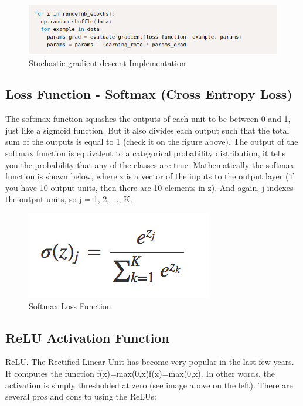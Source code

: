 \documentclass[12pt]{report}
\begin{document}
\begin{figure}[h]
    \centering
    \includegraphics[width=\textwidth]{sgd.png}
    \caption{Stochastic gradient descent Implementation}
\end{figure}

\subsection*{Loss Function - Softmax (Cross Entropy Loss)
}
The softmax function squashes the outputs of each unit to be between 0 and 1, just like a sigmoid function. But it also divides each output such that the total sum of the outputs is equal to 1 (check it on the figure above).
The output of the softmax function is equivalent to a categorical probability distribution, it tells you the probability that any of the classes are true.
Mathematically the softmax function is shown below, where z is a vector of the inputs to the output layer (if you have 10 output units, then there are 10 elements in z). And again, j indexes the output units, so j = 1, 2, ..., K.

\begin{figure}[h]
    \centering
    \includegraphics[scale=.5]{eqn2.png}
    \caption{Softmax Loss Function}
\end{figure}

\subsection*{ReLU Activation Function}

ReLU. The Rectified Linear Unit has become very popular in the last few years. It computes the function f(x)=max(0,x)f(x)=max(0,x). In other words, the activation is simply thresholded at zero (see image above on the left). There are several pros and cons to using the ReLUs:
\end{document}
